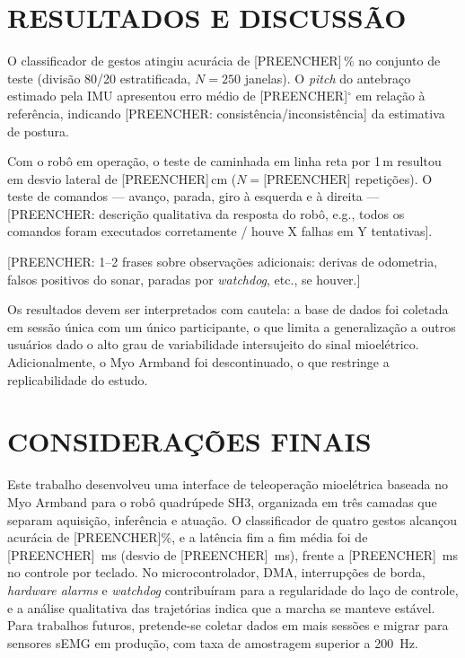 \documentclass[12pt,a4paper]{article}
\begin{document}
\section{RESULTADOS E DISCUSSÃO}

O classificador de gestos atingiu acurácia de [PREENCHER]\,\% no
conjunto de teste (divisão 80/20 estratificada, $N = 250$ janelas). O
\textit{pitch} do antebraço estimado pela IMU apresentou erro médio de
[PREENCHER]$^\circ$ em relação à referência, indicando [PREENCHER:
consistência/inconsistência] da estimativa de postura.

Com o robô em operação, o teste de caminhada em linha reta por 1\,m
resultou em desvio lateral de [PREENCHER]\,cm ($N = \text{[PREENCHER]}$
repetições). O teste de comandos --- avanço, parada, giro à esquerda e
à direita --- [PREENCHER: descrição qualitativa da resposta do robô,
e.g., todos os comandos foram executados corretamente / houve X falhas
em Y tentativas].

[PREENCHER: 1--2 frases sobre observações adicionais: derivas de
odometria, falsos positivos do sonar, paradas por \textit{watchdog},
etc., se houver.]

Os resultados devem ser interpretados com cautela: a base de dados foi
coletada em sessão única com um único participante, o que limita a
generalização a outros usuários dado o alto grau de variabilidade
intersujeito do sinal mioelétrico. Adicionalmente, o Myo Armband foi
descontinuado, o que restringe a replicabilidade do estudo.

\section{CONSIDERAÇÕES FINAIS}

Este trabalho desenvolveu uma interface de teleoperação mioelétrica
baseada no Myo Armband para o robô quadrúpede SH3, organizada em três
camadas que separam aquisição, inferência e atuação. O classificador de
quatro gestos alcançou acurácia de [PREENCHER]\%, e a latência fim a fim
média foi de [PREENCHER]~ms (desvio de [PREENCHER]~ms), frente a
[PREENCHER]~ms no controle por teclado. No microcontrolador, DMA,
interrupções de borda, \textit{hardware alarms} e \textit{watchdog}
contribuíram para a regularidade do laço de controle, e a análise
qualitativa das trajetórias indica que a marcha se manteve estável. Para trabalhos futuros, pretende-se
coletar dados em mais sessões e migrar para sensores sEMG em produção,
com taxa de amostragem superior a 200~Hz.

\renewcommand{\refname}{REFERÊNCIAS}
{\setlength{\bibsep}{2pt}
}
\end{document}
